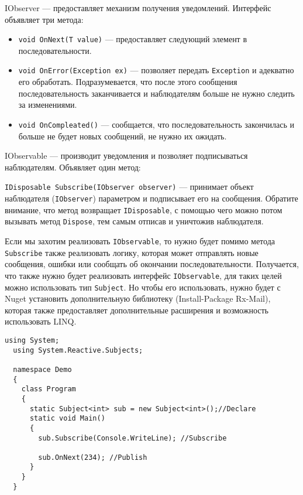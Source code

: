 IObserver --- предоставляет механизм получения уведомлений. Интерфейс объявляет три метода:

\begin{itemize}
  \item \lstinline[style=csharpinlinestyle]!void OnNext(T value)! --- предоставляет следующий элемент в последовательности.
  \item \lstinline[style=csharpinlinestyle]!void OnError(Exception ex)! --- позволяет передать \lstinline[style=csharpinlinestyle]!Exception! и адекватно его обработать. Подразумевается, что после этого сообщения последовательность заканчивается и наблюдателям больше не нужно следить за изменениями.
  \item \lstinline[style=csharpinlinestyle]!void OnCompleated()! --- сообщается, что последовательность закончилась и больше не будет новых сообщений, не нужно их ожидать.
\end{itemize}

IObservable --- производит уведомления и позволяет подписываться наблюдателям. Объявляет один метод:

\lstinline[style=csharpinlinestyle]!IDisposable Subscribe(IObserver observer)! --- принимает объект наблюдателя (\lstinline[style=csharpinlinestyle]!IObserver!) параметром и подписывает его на сообщения.
Обратите внимание, что метод возвращает \lstinline[style=csharpinlinestyle]!IDisposable!, с помощью чего можно потом вызывать метод \lstinline[style=csharpinlinestyle]!Dispose!, тем самым отписав и уничтожив наблюдателя.

Если мы захотим реализовать \lstinline[style=csharpinlinestyle]!IObservable!, то нужно будет помимо метода \lstinline[style=csharpinlinestyle]!Subscribe! также реализовать логику,
которая может отправлять новые сообщения, ошибки или сообщать об окончании последовательности. Получается, что также нужно будет реализовать интерфейс \lstinline[style=csharpinlinestyle]!IObservable!,
для таких целей можно использовать тип \lstinline[style=csharpinlinestyle]!Subject!. Но чтобы его использовать, нужно будет с Nuget установить дополнительную библиотеку (Install-Package Rx-Mail),
которая также предоставляет дополнительные расширения и возможность использовать LINQ.

\begin{lstlisting}[style=csharpinlinestyle, caption={Пример использования Subject}, label=lst:practice:reactive_extensions:subject_example]
  using System;
  using System.Reactive.Subjects;

  namespace Demo
  {
    class Program
    {
      static Subject<int> sub = new Subject<int>();//Declare
      static void Main()
      {
        sub.Subscribe(Console.WriteLine); //Subscribe

        sub.OnNext(234); //Publish
      }
    }
  }
\end{lstlisting}

